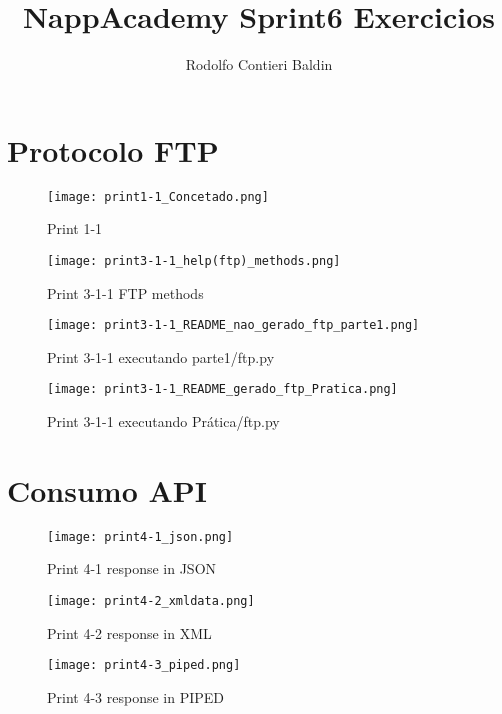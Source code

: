 \documentclass{article}
\author{Rodolfo Contieri Baldin}
\title{NappAcademy Sprint6 Exercicios}
\date{}
\begin{document}
\maketitle


\newpage
\section{Protocolo FTP}


\begin{figure}[ht]
    \centering
    \texttt{[image: print1-1\_Concetado.png]}
    \caption{Print 1-1}
\end{figure}


\begin{figure}[ht]
    \centering
    \texttt{[image: print3-1-1\_help(ftp)\_methods.png]}
    \caption{Print 3-1-1 FTP methods}
\end{figure}

\begin{figure}[ht]
    \centering
    \texttt{[image: print3-1-1\_README\_nao\_gerado\_ftp\_parte1.png]}
    \caption{Print 3-1-1 executando parte1/ftp.py}
\end{figure}

\begin{figure}[ht]
    \centering
    \texttt{[image: print3-1-1\_README\_gerado\_ftp\_Pratica.png]}
    \caption{Print 3-1-1 executando Prática/ftp.py}
\end{figure}

\newpage
\section{Consumo API}

\begin{figure}[ht]
    \centering
    \texttt{[image: print4-1\_json.png]}
    \caption{Print 4-1 response in JSON}
\end{figure}

\begin{figure}[ht]
    \centering
    \texttt{[image: print4-2\_xmldata.png]}
    \caption{Print 4-2 response in XML}
\end{figure}

\begin{figure}[ht]
    \centering
    \texttt{[image: print4-3\_piped.png]}
    \caption{Print 4-3 response in PIPED}
\end{figure}
\end{document}
